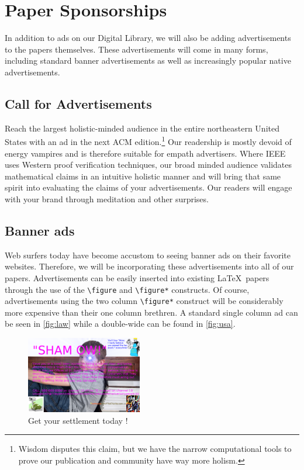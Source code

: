 \section{Paper Sponsorships}
\label{sec:sponsors}
In addition to ads on our Digital Library, we will also be adding
advertisements to the papers themselves.
These advertisements will come in many forms, including standard banner
advertisements as well as increasingly popular native advertisements.

\subsection{Call for Advertisements}
Reach the largest holistic-minded audience in the entire northeastern United
States with an ad in the next ACM edition.\footnote{Wisdom disputes this claim, but we have the narrow computational tools to prove our publication and community have way more holism.}
Our readership is mostly devoid of energy vampires and is therefore suitable
for empath advertisers.
Where IEEE uses Western proof verification techniques, our broad minded
audience validates mathematical claims in an intuitive holistic manner and will
bring that same spirit into evaluating the claims of your advertisements.
Our readers will engage with your brand through meditation and other
surprises.

\subsection{Banner ads}
Web surfers today have become accustom to seeing banner ads on their favorite
websites.
Therefore, we will be incorporating these advertisements into all of our
papers.
Advertisements can be easily inserted into existing \LaTeX\ papers through the
use of the \texttt{\textbackslash figure} and \texttt{\textbackslash figure*}
constructs.
Of course, advertisements using the two column \texttt{\textbackslash figure*}
construct will be considerably more expensive than their one column brethren.
A standard single column ad can be seen in \autoref{fig:law} while a
double-wide can be found in \autoref{fig:usa}.

\begin{figure}
\centering
\includegraphics[width=0.45\textwidth]{figures/law-kid-ad.png}
\caption{Get your settlement today \cite{med-scale}!}
\label{fig:law}
\end{figure}

